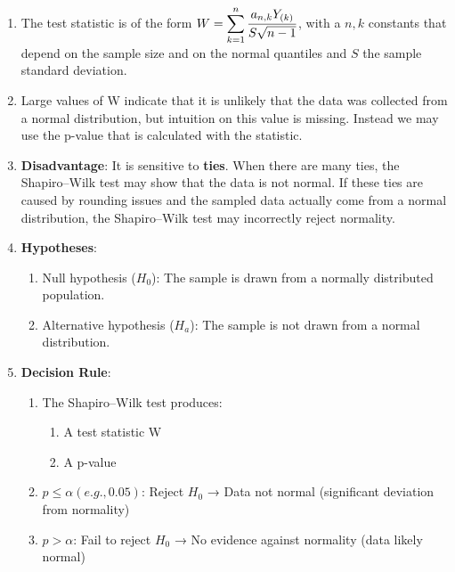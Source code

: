 \begin{enumerate}
    \item  The test statistic is of the form $W = \displaystyle\sum^n_{k=1} \dfrac{a _{n,k} Y_{(k)}}{S\sqrt{n - 1}}$, with a $n,k$ constants that depend on the sample size and on the normal quantiles and $S$ the sample standard deviation.
    \hfill \cite{statistics/book/Statistics-for-Data-Scientists/Maurits-Kaptein}

    \item  Large values of W indicate that it is unlikely that the data was collected from a normal distribution, but intuition on this value is missing. 
    Instead we may use the p-value that is calculated with the statistic. 
    \hfill \cite{statistics/book/Statistics-for-Data-Scientists/Maurits-Kaptein}

    \item \textbf{Disadvantage}:  It is sensitive to \textbf{ties}.
    When there are many ties, the Shapiro–Wilk test may show that the data is not normal. 
    If these ties are caused by rounding issues and the sampled data actually come from a normal distribution, the Shapiro–Wilk test may incorrectly reject normality. 
    \hfill \cite{statistics/book/Statistics-for-Data-Scientists/Maurits-Kaptein}

    \item \textbf{Hypotheses}:
    \begin{enumerate}
        \item Null hypothesis ($H_0$): The sample is drawn from a normally distributed population.

        \item Alternative hypothesis ($H_a$): The sample is not drawn from a normal distribution.
    \end{enumerate}

    \item \textbf{Decision Rule}:
    \hfill \cite{common/online/chatgpt}
    \begin{enumerate}
        \item The Shapiro–Wilk test produces:
        \hfill \cite{common/online/chatgpt}
        \begin{enumerate}
            \item A test statistic W
            \hfill \cite{common/online/chatgpt}

            \item A p-value
            \hfill \cite{common/online/chatgpt}
        \end{enumerate}

        \item $p\leq \alpha (e.g., 0.05)$: Reject $H_0$ → Data not normal (significant deviation from normality)
        \hfill \cite{common/online/chatgpt}

        \item $p>\alpha$: Fail to reject $H_0$ → No evidence against normality (data likely normal)
        \hfill \cite{common/online/chatgpt}
    \end{enumerate}
\end{enumerate}

